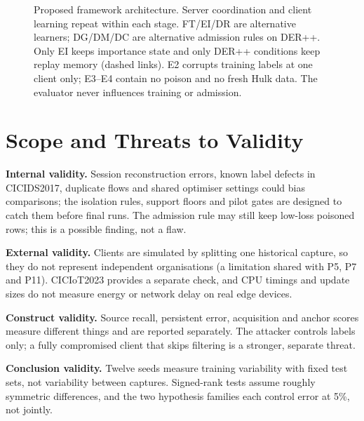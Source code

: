 \documentclass[10pt,a4paper]{article}
\begin{document}
\begin{figure}[htbp]
{
}
\caption{Proposed framework architecture. Server coordination and client learning repeat within each stage. FT/EI/DR are alternative learners; DG/DM/DC are alternative admission rules on DER++. Only EI keeps importance state and only DER++ conditions keep replay memory (dashed links). E2 corrupts training labels at one client only; E3--E4 contain no poison and no fresh Hulk data. The evaluator never influences training or admission.}
\label{fig:framework}
\end{figure}

\section{Scope and Threats to Validity}
\textbf{Internal validity.} Session reconstruction errors, known label defects in CICIDS2017, duplicate flows and shared optimiser settings could bias comparisons; the isolation rules, support floors and pilot gates are designed to catch them before final runs. The admission rule may still keep low-loss poisoned rows; this is a possible finding, not a flaw.

\textbf{External validity.} Clients are simulated by splitting one historical capture, so they do not represent independent organisations (a limitation shared with P5, P7 and P11). CICIoT2023 provides a separate check, and CPU timings and update sizes do not measure energy or network delay on real edge devices.

\textbf{Construct validity.} Source recall, persistent error, acquisition and anchor scores measure different things and are reported separately. The attacker controls labels only; a fully compromised client that skips filtering is a stronger, separate threat.

\textbf{Conclusion validity.} Twelve seeds measure training variability with fixed test sets, not variability between captures. Signed-rank tests assume roughly symmetric differences, and the two hypothesis families each control error at 5\%, not jointly.

\appendix
\end{document}
